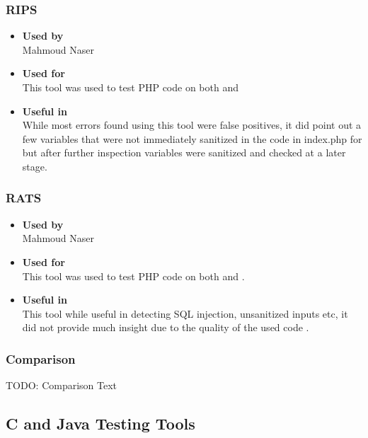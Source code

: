 \subsubsection*{RIPS}
\begin{itemize}
	\item \textbf{Used by}\\ Mahmoud Naser
	\item \textbf{Used for}\\ This tool was used to test PHP code on both \bs and \gnb

	\item \textbf{Useful in}\\ 	While most errors found using this tool were false positives, it did point out a few variables that were not immediately sanitized in the code in index.php for \bs but after further inspection variables were sanitized and checked at a later stage.
\end{itemize}

\subsubsection*{RATS}
\begin{itemize}
	\item \textbf{Used by}\\ Mahmoud Naser
	\item \textbf{Used for}\\ This tool was used to test PHP code on both \bs and \gnb.
	\item \textbf{Useful in}\\ This tool while useful in detecting SQL injection, unsanitized inputs etc, it did not provide much insight due to the quality of the used code .
\end{itemize}

\subsubsection*{Comparison}
TODO: Comparison Text


\subsection*{C and Java Testing Tools}

